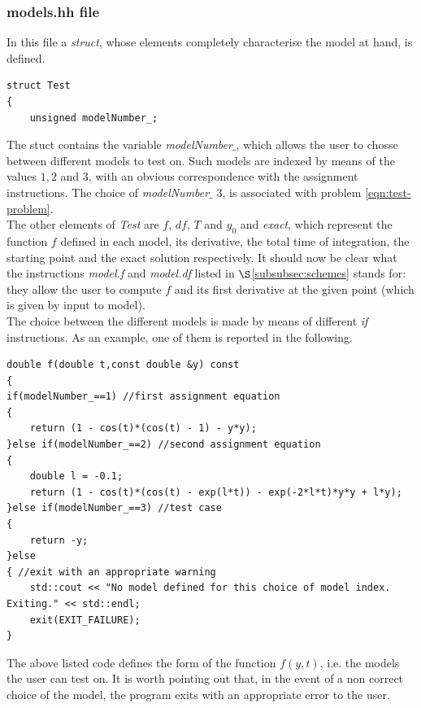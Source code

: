 \documentclass[11pt]{article}
\theoremstyle{theorem}
\theoremstyle{definition}
\begin{document}
\subsubsection{models.hh file}
\label{subsubsec:models}
In this file a \emph{struct}, whose elements completely characterise the model at hand, is defined.

\begin{lstlisting}
struct Test
{
	unsigned modelNumber_;
\end{lstlisting}

The stuct contains the variable \emph{modelNumber$\_$}, which allows the user to chosse between different models to test on. Such models are indexed by means of the values $1, 2$ and $3$, with an obvious correspondence with the assignment instructions. The choice of \emph{modelNumber$\_$} 3, is associated with problem \eqref{eqn:test-problem}.\\
The other elements of \emph{Test} are $f$, $df$, $T$ and $y_0$ and \emph{exact}, which represent the function $f$ defined in each model, its derivative, the total time of integration, the starting point and the exact solution respectively. It should now be clear what the instructions \emph{model.f} and \emph{model.df} listed in $\S$\ref{subsubsec:schemes} stands for: they allow the user to compute $f$ and its first derivative at the given point (which is given by input to model).\\
The choice between the different models is made by means of different \emph{if} instructions. As an example, one of them is reported in the following.\\

\begin{lstlisting}
double f(double t,const double &y) const
{
if(modelNumber_==1) //first assignment equation
{
	return (1 - cos(t)*(cos(t) - 1) - y*y);
}else if(modelNumber_==2) //second assignment equation
{
	double l = -0.1;
	return (1 - cos(t)*(cos(t) - exp(l*t)) - exp(-2*l*t)*y*y + l*y);
}else if(modelNumber_==3) //test case
{
	return -y;
}else
{ //exit with an appropriate warning
	std::cout << "No model defined for this choice of model index. Exiting." << std::endl;
	exit(EXIT_FAILURE);
}
\end{lstlisting}

The above listed code defines the form of the function $f(y,t)$, i.e. the models the user can test on. It is worth pointing out that, in the event of a non correct choice of the model, the program exits with an appropriate error to the user.\\
\end{document}
